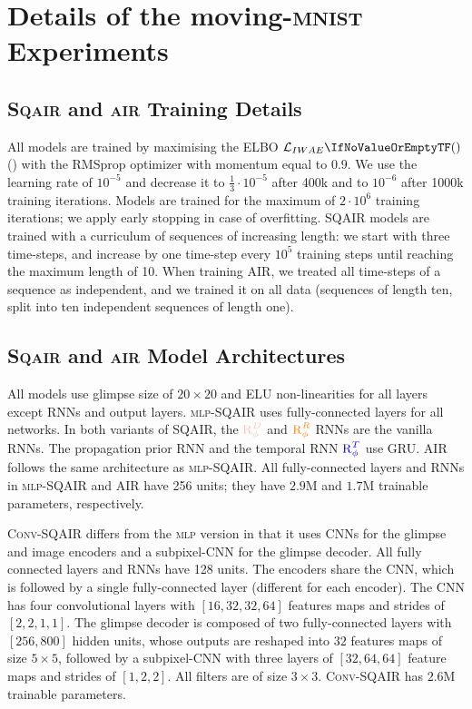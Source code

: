 \section{Details of the moving-\textsc{mnist} Experiments}
\label{app:mnist_details}

\subsection{\textsc{Sqair} and \textsc{air} Training Details}
    All models are trained by maximising the \gls{ELBO} $\loss[IWAE]$ () with the \gls{RMSprop} optimizer \citep{Tieleman2012rms} with momentum equal to $0.9$. We use the learning rate of $10^{-5}$ and decrease it to $\frac{1}{3} \cdot 10^{-5}$ after 400k and to $10^{-6}$ after 1000k training iterations. Models are trained for the maximum of $2 \cdot 10^6$ training iterations; we apply early stopping in case of overfitting.
    \Gls{SQAIR} models are trained with a curriculum of sequences of increasing length: we start with three time-steps, and increase by one time-step every $10^5$ training steps until reaching the maximum length of 10.
    When training \gls{AIR}, we treated all time-steps of a sequence as independent, and we trained it on all data (sequences of length ten, split into ten independent sequences of length one). 

\subsection{\textsc{Sqair} and \textsc{air} Model Architectures}
    All models use glimpse size of $20 \times 20$ and \gls{ELU} \citep{Clevert2015elu} non-linearities for all layers except \glspl{RNN} and output layers.
    \textsc{mlp}-\gls{SQAIR} uses fully-connected layers for all networks. In both variants of \gls{SQAIR}, the $\RD$ and $\textcolor{orange}{\operatorname{R}_\phi^R}$ \glspl{RNN} are the vanilla \glspl{RNN}. The propagation prior \gls{RNN} and the temporal \gls{RNN} $\textcolor{blue}{\operatorname{R}_\phi^T}$ use \gls{GRU}. \gls{AIR} follows the same architecture as \textsc{mlp}-\gls{SQAIR}. All fully-connected layers and \glspl{RNN} in \textsc{mlp}-\gls{SQAIR} and \gls{AIR} have 256 units; they have $2.9$M and $1.7$M trainable parameters, respectively.
    
    \textsc{Conv}-\gls{SQAIR} differs from the  \textsc{mlp} version in that it uses \glspl{CNN} for the glimpse and image encoders and a subpixel-\gls{CNN} \citep{Shi2016subpixel} for the glimpse decoder. All fully connected layers and \glspl{RNN} have 128 units. 
    The encoders share the \gls{CNN}, which is followed by a single fully-connected layer (different for each encoder).
    The \gls{CNN} has four convolutional layers with $[16,32,32,64]$ features maps and strides of $[2,2,1,1]$. The glimpse decoder is composed of two fully-connected layers with $[256, 800]$ hidden units, whose outputs are reshaped into $32$ features maps of size $5 \times 5$, followed by a subpixel-\gls{CNN} with three layers of $[32,64,64]$ feature maps and strides of $[1, 2, 2]$.
    All filters are of size $3 \times 3$.
    \textsc{Conv}-\gls{SQAIR} has $2.6$M trainable parameters.
    

